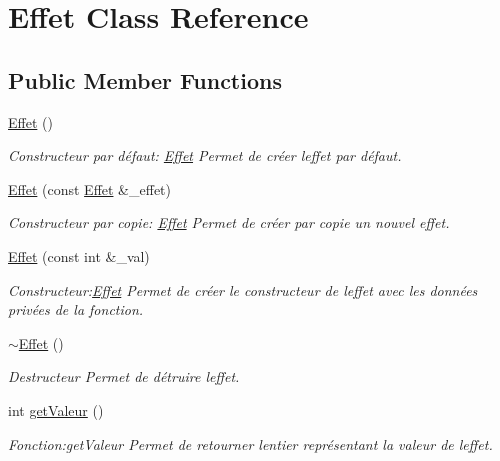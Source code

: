 \hypertarget{classEffet}{}\section{Effet Class Reference}
\label{classEffet}
\subsection*{Public Member Functions}
\begin{DoxyCompactItemize}
\item 
\hyperlink{classEffet_a79744b45fc5715a4742e63565d4f89cb}{Effet} ()
\begin{DoxyCompactList}\small\item\em Constructeur par défaut\+: \hyperlink{classEffet}{Effet} Permet de créer l\textquotesingle{}effet par défaut. \end{DoxyCompactList}\item 
\hyperlink{classEffet_a48bc981d19131a8b0b562874d21b014d}{Effet} (const \hyperlink{classEffet}{Effet} \&\+\_\+effet)
\begin{DoxyCompactList}\small\item\em Constructeur par copie\+: \hyperlink{classEffet}{Effet} Permet de créer par copie un nouvel effet. \end{DoxyCompactList}\item 
\hyperlink{classEffet_a29d6d24eaf9a773e74732919c5a4003a}{Effet} (const int \&\+\_\+val)
\begin{DoxyCompactList}\small\item\em Constructeur\+:\hyperlink{classEffet}{Effet} Permet de créer le constructeur de l\textquotesingle{}effet avec les données privées de la fonction. \end{DoxyCompactList}\item 
\mbox{\label{classEffet_a8bacc915cc7c148661bde9c9c732b6dd}} 
\hyperlink{classEffet_a8bacc915cc7c148661bde9c9c732b6dd}{$\sim$\+Effet} ()
\begin{DoxyCompactList}\small\item\em Destructeur Permet de détruire l\textquotesingle{}effet. \end{DoxyCompactList}\item 
int \hyperlink{classEffet_ab47e7ca4baed53d6955ad59a41d79538}{get\+Valeur} ()
\begin{DoxyCompactList}\small\item\em Fonction\+:get\+Valeur Permet de retourner l\textquotesingle{}entier représentant la valeur de l\textquotesingle{}effet. \end{DoxyCompactList}\item 

\end{DoxyCompactItemize}
